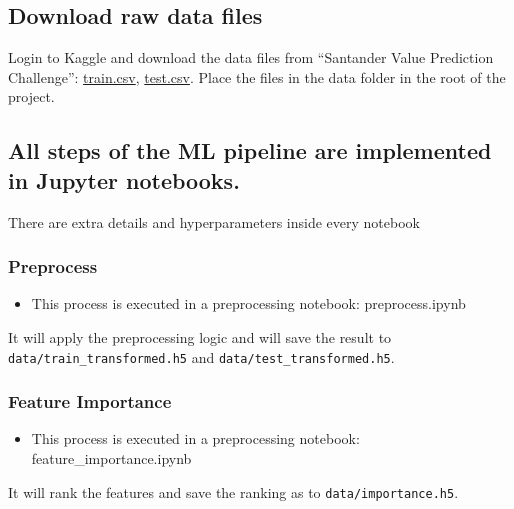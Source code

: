 \documentclass[11pt]{article}
\providecommand{\tightlist}{%
      \setlength{\itemsep}{0pt}\setlength{\parskip}{0pt}}
\begin{document}
    \hypertarget{download-raw-data-files}{%
\subsection{Download raw data files}\label{download-raw-data-files}}

Login to Kaggle and download the data files from ``Santander Value
Prediction Challenge'':
\href{https://www.kaggle.com/c/santander-value-prediction-challenge/download/train.csv}{train.csv},
\href{https://www.kaggle.com/c/santander-value-prediction-challenge/download/test.csv}{test.csv}.
Place the files in the data folder in the root of the project.

    \hypertarget{all-steps-of-the-ml-pipeline-are-implemented-in-jupyter-notebooks.}{%
\subsection{All steps of the ML pipeline are implemented in Jupyter
notebooks.}\label{all-steps-of-the-ml-pipeline-are-implemented-in-jupyter-notebooks.}}

There are extra details and hyperparameters inside every notebook

    \hypertarget{preprocess}{%
\subsubsection{Preprocess}\label{preprocess}}

\begin{itemize}
\tightlist
\item
  This process is executed in a preprocessing notebook: preprocess.ipynb
\end{itemize}

It will apply the preprocessing logic and will save the result to
\texttt{data/train\_transformed.h5} and
\texttt{data/test\_transformed.h5}.

    \hypertarget{feature-importance}{%
\subsubsection{Feature Importance}\label{feature-importance}}

\begin{itemize}
\tightlist
\item
  This process is executed in a preprocessing notebook:
  feature\_importance.ipynb
\end{itemize}

It will rank the features and save the ranking as to
\texttt{data/importance.h5}.
\end{document}
